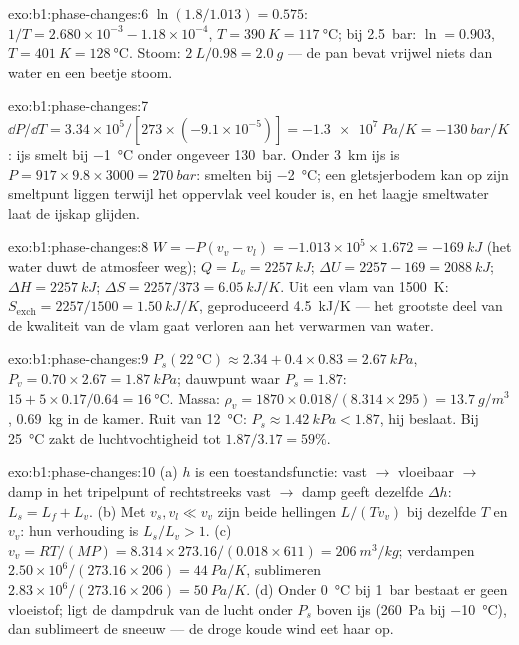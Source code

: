 \begin{solution}{exo:b1:phase-changes:6}
$\ln(1.8/1.013) = 0.575$: $1/T = 2.680 \times 10^{-3} - 1.18 \times 10^{-4}$,
$T = \qty{390}{K} = \qty{117}{\degreeCelsius}$; bij \qty{2.5}{bar}: $\ln = 0.903$,
$T = \qty{401}{K} = \qty{128}{\degreeCelsius}$. Stoom: $\qty{2}{L}/0.98 =
\qty{2.0}{g}$ --- de pan bevat vrijwel niets dan water en een beetje
stoom.
\end{solution}

\begin{solution}{exo:b1:phase-changes:7}
$\dd P/\dd T = 3.34 \times 10^5/[273 \times (-9.1 \times 10^{-5})] = \qty{-1.3e7}{Pa/K}
= \qty{-130}{bar/K}$: ijs smelt bij \qty{-1}{\degreeCelsius} onder ongeveer
\qty{130}{bar}. Onder \qty{3}{km} ijs is $P = 917 \times 9.8 \times 3000 =
\qty{270}{bar}$: smelten bij \qty{-2}{\degreeCelsius}; een gletsjerbodem kan op
zijn smeltpunt liggen terwijl het oppervlak veel kouder is, en het laagje
smeltwater laat de ijskap glijden.
\end{solution}

\begin{solution}{exo:b1:phase-changes:8}
$W = -P(v_v - v_l) = -1.013 \times 10^5 \times 1.672 = \qty{-169}{kJ}$ (het water
duwt de atmosfeer weg); $Q = L_v = \qty{2257}{kJ}$; $\Delta U = 2257 - 169
= \qty{2088}{kJ}$; $\Delta H = \qty{2257}{kJ}$; $\Delta S = 2257/373 = \qty{6.05}{kJ/K}$.
Uit een vlam van \qty{1500}{K}: $S_{\mathrm{exch}} = 2257/1500 = \qty{1.50}{kJ/K}$,
geproduceerd \qty{4.5}{kJ/K} --- het grootste deel van de kwaliteit van de vlam gaat
verloren aan het verwarmen van water.
\end{solution}

\begin{solution}{exo:b1:phase-changes:9}
$P_s(\qty{22}{\degreeCelsius}) \approx 2.34 + 0.4 \times 0.83 = \qty{2.67}{kPa}$,
$P_v = 0.70 \times 2.67 = \qty{1.87}{kPa}$; dauwpunt waar $P_s = 1.87$: $15 +
5 \times 0.17/0.64 = \qty{16}{\degreeCelsius}$. Massa: $\rho_v = 1870 \times 0.018/
(8.314 \times 295) = \qty{13.7}{g/m^3}$, \qty{0.69}{kg} in de kamer. Ruit van
\qty{12}{\degreeCelsius}: $P_s \approx \qty{1.42}{kPa} < 1.87$, hij beslaat. Bij
\qty{25}{\degreeCelsius} zakt de luchtvochtigheid tot $1.87/3.17 = 59\%$.
\end{solution}

\begin{solution}{exo:b1:phase-changes:10}
(a) $h$ is een toestandsfunctie: vast $\to$ vloeibaar $\to$ damp in het
tripelpunt of rechtstreeks vast $\to$ damp geeft dezelfde $\Delta h$:
$L_s = L_f + L_v$. (b) Met $v_s, v_l \ll v_v$ zijn beide hellingen $L/(Tv_v)$ bij
dezelfde $T$ en $v_v$: hun verhouding is $L_s/L_v > 1$. (c) $v_v = RT/(MP) =
8.314 \times 273.16/(0.018 \times 611) = \qty{206}{m^3/kg}$; verdampen
$2.50 \times 10^6/(273.16 \times 206) = \qty{44}{Pa/K}$, sublimeren $2.83 \times 10^6/
(273.16 \times 206) = \qty{50}{Pa/K}$. (d) Onder \qty{0}{\degreeCelsius} bij
\qty{1}{bar} bestaat er geen vloeistof; ligt de dampdruk van de lucht onder
$P_s$ boven ijs (\qty{260}{Pa} bij \qty{-10}{\degreeCelsius}), dan sublimeert de
sneeuw --- de droge koude wind eet haar op.
\end{solution}


